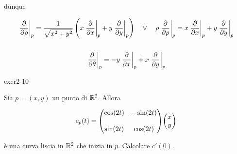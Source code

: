{dunque

\begin{gather}
	\eval{\pdv{\rho}}_{p} = \dfrac{1}{\sqrt{x^{2} + y^{2}}} \left( x \eval{\pdv{x}}_{p} + y \eval{\pdv{y}}_{p} \right) %
	\quad \lor \quad %
	\rho \eval{\pdv{\rho}}_{p} = x \eval{\pdv{x}}_{p} + y \eval{\pdv{y}}_{p} \\
	\nonumber \\
	\eval{\pdv{\theta}}_{p} = - y \eval{\pdv{x}}_{p} + x \eval{\pdv{y}}_{p}
\end{gather}
}


{exer2-10}
{
Sia $ p = (x,y) $ un punto di $ \mathbb{R}^{2} $. Allora

\begin{equation}
	c_{p}(t) = \mqty( \cos(2t) & -\sin(2t) \\ \\ \sin(2t) & \cos(2t) ) \mqty(x \\ y)
\end{equation}

è una curva liscia in $ \mathbb{R}^{2} $ che inizia in $ p $. Calcolare $ c'(0) $.
}
